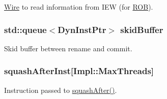 \label{classDefaultCommit_a2b90705fefdf84763685650c2420f184}
\hyperlink{classWire}{Wire} to read information from IEW (for \hyperlink{classROB}{ROB}). \hypertarget{classDefaultCommit_ab9508ede35e5a000089a1450342412be}{
\subsubsection[{skidBuffer}]{\setlength{\rightskip}{0pt plus 5cm}std::queue$<${\bf DynInstPtr}$>$ {\bf skidBuffer}}}
\label{classDefaultCommit_ab9508ede35e5a000089a1450342412be}
Skid buffer between rename and commit. \hypertarget{classDefaultCommit_af0c3f70b9be736dfd854ea22a0131e1c}{
\subsubsection[{squashAfterInst}]{ {\bf squashAfterInst}\mbox{[}Impl::MaxThreads\mbox{]}}}
\label{classDefaultCommit_af0c3f70b9be736dfd854ea22a0131e1c}
Instruction passed to \hyperlink{classDefaultCommit_ad47b387a7bbc4a2153b50f96b8fd2a51}{squashAfter()}.

